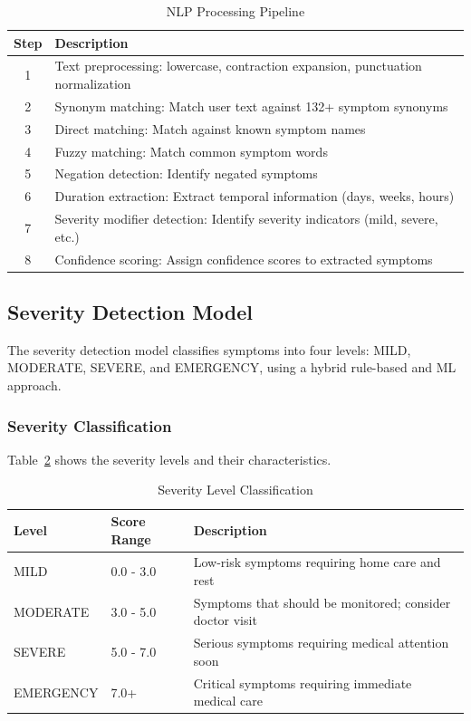 \documentclass[12pt,a4paper]{article}
\begin{document}
\begin{table}[H]
\centering
\caption{NLP Processing Pipeline}
\label{tab:nlppipeline}
\begin{tabularx}{\textwidth}{|c|X|}
\hline
\textbf{Step} & \textbf{Description} \\
\hline
1 & Text preprocessing: lowercase, contraction expansion, punctuation normalization \\
\hline
2 & Synonym matching: Match user text against 132+ symptom synonyms \\
\hline
3 & Direct matching: Match against known symptom names \\
\hline
4 & Fuzzy matching: Match common symptom words \\
\hline
5 & Negation detection: Identify negated symptoms \\
\hline
6 & Duration extraction: Extract temporal information (days, weeks, hours) \\
\hline
7 & Severity modifier detection: Identify severity indicators (mild, severe, etc.) \\
\hline
8 & Confidence scoring: Assign confidence scores to extracted symptoms \\
\hline
\end{tabularx}
\end{table}

\subsection{Severity Detection Model}
The severity detection model classifies symptoms into four levels: MILD, MODERATE, SEVERE, and EMERGENCY, using a hybrid rule-based and ML approach.

\subsubsection{Severity Classification}
Table~\ref{tab:severity} shows the severity levels and their characteristics.

\begin{table}[H]
\centering
\caption{Severity Level Classification}
\label{tab:severity}
\begin{tabularx}{\textwidth}{|l|X|X|}
\hline
\textbf{Level} & \textbf{Score Range} & \textbf{Description} \\
\hline
MILD & 0.0 - 3.0 & Low-risk symptoms requiring home care and rest \\
\hline
MODERATE & 3.0 - 5.0 & Symptoms that should be monitored; consider doctor visit \\
\hline
SEVERE & 5.0 - 7.0 & Serious symptoms requiring medical attention soon \\
\hline
EMERGENCY & 7.0+ & Critical symptoms requiring immediate medical care \\
\hline
\end{tabularx}
\end{table}
\end{document}
